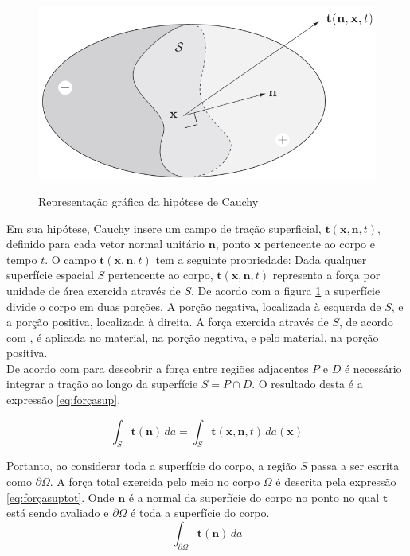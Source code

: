 \begin{figure}[H]
    \centering
    \caption{Representação gráfica da hipótese de Cauchy}
    \includegraphics[width = 0.7 \textwidth]{images/hipoteseCauchy.png}
    \label{fig:hipotesecauchy}
\end{figure}

Em sua hipótese, Cauchy insere um campo de tração superficial, $ \boldsymbol{t}(\boldsymbol{x, n},t) $, definido para cada vetor normal unitário $ \boldsymbol{n} $, ponto $ \boldsymbol{x} $ pertencente ao corpo e tempo $ t $. O campo $ \boldsymbol{t}(\boldsymbol{x, n},t) $ tem a seguinte propriedade: Dada qualquer superfície espacial $ S $ pertencente ao corpo, $ \boldsymbol{t}(\boldsymbol{x, n},t) $ representa a força por unidade de área exercida através de $ S $. De acordo com a figura \ref{fig:hipotesecauchy} a superfície divide o corpo em duas porções. A porção negativa, localizada à esquerda de $S$, e a porção positiva, localizada à direita. A força exercida através de $S$, de acordo com \cite{gurtin_fried_anand_2013}, é aplicada no material, na porção negativa, e pelo material, na porção positiva.  \\

De acordo com \cite{gurtin_fried_anand_2013} para descobrir a força entre regiões adjacentes $ P $ e $D$ é necessário  integrar a tração ao longo da superfície $ S=P\cap D $. O resultado desta é a expressão \ref{eq:forçasup}.

\begin{equation}
    \int_{S} \boldsymbol{t(n)}\, da = \int_{S} \boldsymbol{t}(\boldsymbol{x, n},t) \, da(\boldsymbol{x})
    \label{eq:forçasup}
\end{equation}

Portanto, ao considerar toda a superfície do corpo, a região $S$ passa a ser escrita como $\partial \Omega$. A força total exercida pelo meio no corpo $ \Omega $ é descrita pela expressão \ref{eq:forçasuptot}. Onde $\boldsymbol{n}$ é a normal da superfície do corpo no ponto no qual $\boldsymbol{t}$ está sendo avaliado e $\partial \Omega$ é toda a superfície do corpo.
\begin{equation}
    \int_{\partial \Omega} \boldsymbol{t(n)} \, da
    \label{eq:forçasuptot}
\end{equation}

